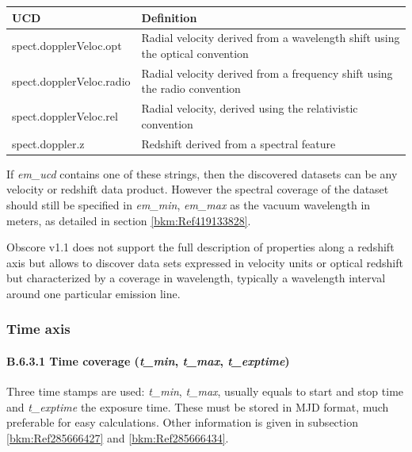 \documentclass[11pt,a4paper]{ivoa}
\begin{document}
\vspace{0.3cm}
\begin{tabular}{|p{}|p{}|}
\hline
UCD & Definition\\\hline
spect.dopplerVeloc.opt & Radial velocity derived from a wavelength shift using the optical convention\\\hline
spect.dopplerVeloc.radio & Radial velocity derived from a frequency shift using the radio convention\\\hline
spect.dopplerVeloc.rel & Radial velocity, derived using the relativistic convention\\\hline
spect.doppler.z & Redshift derived from a spectral feature\\\hline
\end{tabular}%
\vspace{0.3cm}


If \emph{em\_ucd} contains one of these strings, then the discovered datasets can be any velocity or redshift data product.
However the spectral coverage of the dataset should still be specified in \emph{em\_min}, \emph{em\_max} as the vacuum wavelength in
meters, as detailed in section \ref{bkm:Ref419133828}.

Obscore v1.1 does not support the full description of  properties along a redshift axis but allows to discover data sets
expressed in velocity units  or optical redshift but characterized by a coverage in wavelength, typically a wavelength
interval around one particular emission line.

\subsubsection{Time axis}

\paragraph{B.6.3.1 Time coverage (\emph{t\_min}, \emph{t\_max}, \emph{t\_exptime})}
Three time stamps are used: \emph{t\_min}, \emph{t\_max}, usually equals to start and stop time and \emph{t\_exptime} the exposure time.
These must be stored in MJD format, much preferable for easy calculations. Other information is given in subsection
\ref{bkm:Ref285666427} and \ref{bkm:Ref285666434}.

\end{document}
